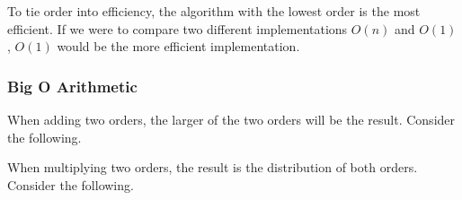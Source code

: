 To tie order into efficiency, the algorithm with the lowest order is the most efficient. If we were to compare two different implementations $O(n)$ and $O(1)$, $O(1)$ would be the more efficient implementation.\\

\subsubsection*{Big O Arithmetic}

When adding two orders, the larger of the two orders will be the result. Consider the following.\\


\clearpage
When multiplying two orders, the result is the distribution of both orders. Consider the following.\\

